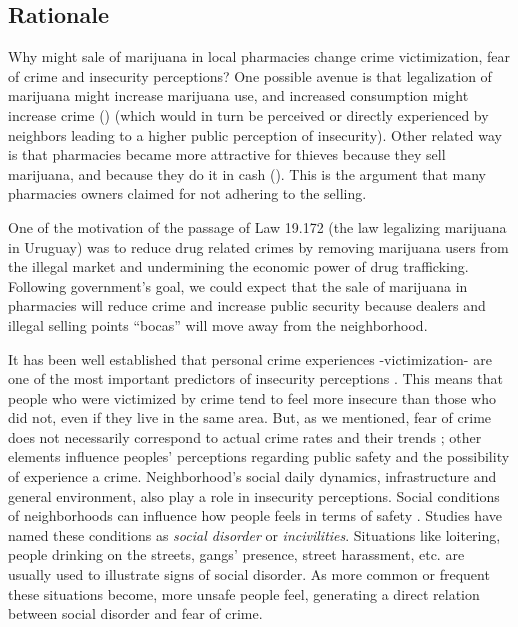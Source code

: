 \documentclass[11pt]{article}
\begin{document}
\subsection{Rationale}
Why might sale of marijuana in local pharmacies change crime victimization, fear of crime and insecurity perceptions? One possible avenue is that legalization of marijuana might increase marijuana use, and increased consumption might increase crime (\cite{pacula2003marijuana}) (which would in turn be perceived or directly experienced by neighbors leading to a higher public perception of insecurity). Other related way is that pharmacies became more attractive for thieves because they sell marijuana, and because they do it in cash (\cite{hunt2018high}). This is the argument that many pharmacies owners claimed for not adhering to the selling.

One of the motivation of the passage of Law 19.172 (the law legalizing marijuana in Uruguay) was to reduce drug related crimes by removing marijuana users from the illegal market and undermining the economic power of drug trafficking. Following government's goal, we could expect that the sale of marijuana in pharmacies will reduce crime and increase public security because dealers and illegal selling points ``bocas'' will move away from the neighborhood.

It has been well established that personal crime experiences -victimization- are one of the most important predictors of insecurity perceptions \citep{cruz2009public}. This means that people who were victimized by crime tend to feel more insecure than those who did not, even if they live in the same area. But, as we mentioned, fear of crime does not necessarily correspond to actual crime rates and their trends \citep{wong2012bringing}; other elements influence peoples' perceptions regarding public safety and the possibility of experience a crime. Neighborhood's social daily dynamics, infrastructure and general environment, also play a role in insecurity perceptions. Social conditions of neighborhoods can influence how people feels in terms of safety \citep{cruz2009public, brunton2011neighborhoods, valera2014perceived}. Studies have named these conditions as \textit{social disorder} or \textit{incivilities}. Situations like loitering, people drinking on the streets, gangs' presence, street harassment, etc. \citep{bennett1994determinants, valera2014perceived} are usually used to illustrate signs of social disorder. As more common or frequent these situations become, more unsafe people feel, generating a direct relation between social disorder and fear of crime.
\end{document}

